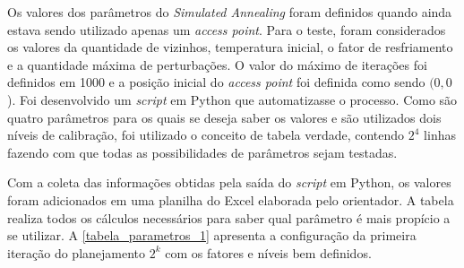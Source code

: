 \documentclass[
	12pt,				%
	twoside,			%
	a4paper,			%
	english,			%
	french,				%
	spanish,			%
	brazil				%
	]{abntex2}
\begin{document}
Os valores dos parâmetros do \emph{Simulated Annealing} foram definidos
quando ainda estava sendo utilizado apenas um \emph{access point}. Para
o teste, foram considerados os valores da quantidade de vizinhos,
temperatura inicial, o fator de resfriamento e a quantidade máxima de
perturbações. O valor do máximo de iterações foi definidos em 1000 e a
posição inicial do \emph{access point} foi definida como sendo
\((0, 0\)). Foi desenvolvido um \emph{script} em Python que
automatizasse o processo. Como são quatro parâmetros para os quais se
deseja saber os valores e são utilizados dois níveis de calibração, foi
utilizado o conceito de tabela verdade, contendo \(2^{4}\) linhas
fazendo com que todas as possibilidades de parâmetros sejam testadas.

Com a coleta das informações obtidas pela saída do \emph{script} em
Python, os valores foram adicionados em uma planilha do Excel elaborada
pelo orientador. A tabela realiza todos os cálculos necessários para
saber qual parâmetro é mais propício a se utilizar. A
\autoref{tabela_parametros_1} apresenta a configuração da primeira
iteração do planejamento \(2^{k}\) com os fatores e níveis bem
definidos.

\begin{table}[ht]
    \centering
    \caption{Níveis propostos para os parâmetros do \textit{Simulated Annealing} na primeira iteração.}
    \label{tabela_parametros_1}
\end{table}
\end{document}
